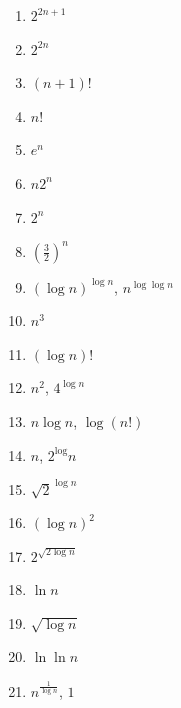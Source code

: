 \documentclass{article}
\begin{document}
\begin{enumerate}
	\begin{enumerate}
		\item $2^{2n+1}$
		\item $2^{2n}$
		\item $(n+1)!$
		\item $n!$
		\item $e^n$
		\item $n2^n$
		\item $2^n$
		\item $(\frac{3}{2})^n$
		\item $(\log n)^{\log n}$, $n^{\log \log n}$
		\item $n^3$
		\item $(\log n)!$
		\item $n^2$, $4^{\log n}$
		\item $n \log n$, $\log (n!)$
		\item $n$, $2^{\log}n$
		\item $\sqrt{2}^{\log n}$
		\item $(\log n)^2$
		\item $2^{\sqrt{2\log n}}$
		\item $\ln n$
		\item $\sqrt{\log n}$
		\item $\ln \ln n$
		\item $n^{\frac{1}{\log n}}$, $1$
	\end{enumerate}
\end{enumerate}
	
\end{document}
